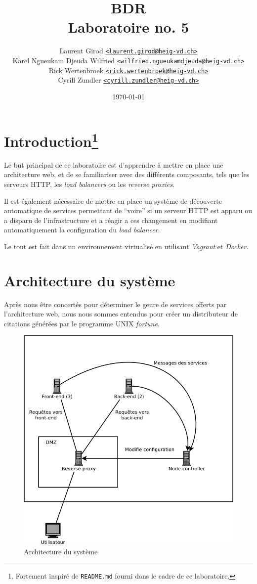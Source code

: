\documentclass[a4paper,11pt,titlepage]{article}
\author{Laurent Girod \href{mailto:laurent.girod@heig-vd.ch}{\texttt{<laurent.girod@heig-vd.ch>}}\\
	Karel Ngueukam Djeuda Wilfried \href{wilfried.ngueukamdjeuda@heig-vd.ch}{\texttt{<wilfried.ngueukamdjeuda@heig-vd.ch>}}\\
	Rick Wertenbroek \href{mailto:rick.wertenbroek@heig-vd.ch}{\texttt{<rick.wertenbroek@heig-vd.ch>}}\\
	Cyrill Zundler \href{mailto:cyrill.zundler@heig-vd.ch}{\texttt{<cyrill.zundler@heig-vd.ch>}}
}
\date{\today}
\title{BDR\\Laboratoire no. 5}
\begin{document}
\maketitle
\tableofcontents
\newpage

\section[Introduction]{Introduction\protect\footnote{Fortement inspiré de \texttt{README.md} fourni dans le cadre de ce laboratoire.}}
Le but principal de ce laboratoire est d'apprendre à mettre en place une architecture web, et de se familiariser avec
des différents composants, tels que les serveurs HTTP, les \emph{load balancers} ou les \emph{reverse proxies}.

Il est également nécessaire de mettre en place un système de découverte automatique de services permettant de ``voire''
si un serveur HTTP est apparu ou a disparu de l'infrastructure et a réagir a ces changement en modifiant
automatiquement la configuration du \emph{load balancer}.

Le tout est fait dans un environnement virtualisé en utilisant \emph{Vagrant} et \emph{Docker}. 

\section{Architecture du système}
Après nous être concertés pour déterminer le genre de services offerts par l'architecture web, nous nous sommes entendus
pour créer un distributeur de citations générées par le programme UNIX \emph{fortune}.
\begin{figure}[h!]
	\centering
	\includegraphics[scale=0.5]{schema.png}
	\caption{Architecture du système}
\end{figure}
\end{document}
